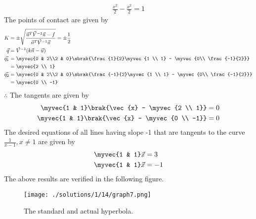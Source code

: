 \begin{align}
	\frac{x^2}{2} - \frac{x^2}{2} = 1
\end{align}
The points of contact are given by 
\begin{align}
  \tiny{K} &=\pm \sqrt{\frac{\vec{u}^T\vec{V}^{-1}\vec{u} - f}{\vec{n}^T\vec{V}^{-1}\vec{n}}}
  = \pm \frac{1}{2}\\
  \vec{q} &= \vec{V}^{-1}(k\vec{n}-\vec{u})\\
  \vec{q_1} &= \myvec{0 & 2\\2 & 0} \sbrak{\frac{1}{2}\myvec{1 \\ 1} - \myvec{0\\ \frac{-1}{2}}}\\
  &= \myvec{2 \\ 1}\\
  \vec{q_2} &= \myvec{0 & 2\\2 & 0} \sbrak{\frac{-1}{2}\myvec{1 \\ 1} - \myvec{0\\ \frac{-1}{2}}}\\
  &= \myvec{0 \\ -1}
\end{align} 
$\therefore$ The tangents are given by
\begin{align}
	\myvec{1 & 1} \brak{\vec{x} - \myvec{2 \\ 1}} = 0 \\
	\myvec{1 & 1} \brak{\vec{x} - \myvec{0 \\ -1}} = 0
\end{align}
The desired equations of all lines having slope -1 that are tangents to the curve $\frac{1}{x-1}, x \neq 1$ are given by
\begin{align}
	\myvec{1 & 1}\vec{x} &= 3 \\
	\myvec{1 & 1}\vec{x} &= -1 
\end{align}
The above results are verified in the following figure.
\begin{figure}[h!] \label{eq:solutions/1/14/fig:tangents}
	\centering
	\texttt{[image: ./solutions/1/14/graph7.png]}
	\caption{The standard and actual hyperbola.}
\end{figure}
